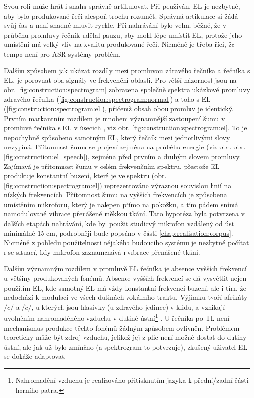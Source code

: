 Svou roli může hrát i snaha správně artikulovat.
Při používání EL je nezbytné, aby bylo produkované řeči alespoň trochu rozumět.
Správná artikulace si žádá svůj čas a není snadné mluvit rychle.
Při nahrávání bylo velmi běžné, že v průběhu promluvy řečník udělal pauzu, aby mohl lépe umístit EL, protože jeho umístění má velký vliv na kvalitu produkované řeči.
Nicméně je třeba říci, že tempo není pro ASR systémy problém.

Dalším způsobem jak ukázat rozdíly mezi promluvou zdravého řečníka a řečníka s EL, je porovnat oba signály ve frekvenční oblasti.
Pro větší názornost jsou na obr. \ref{fig:construction:spectrogram} zobrazena společně spektra ukázkové promluvy zdravého řečníka (\ref{fig:construction:spectrogram:normal}) a toho s EL (\ref{fig:construction:spectrogram:el}), přičemž obsah obou promluv je identický.
Prvním markantním rozdílem je mnohem významnější zastoupení šumu v promluvě řečníka s EL v úsecích , viz obr. \ref{fig:construction:spectrogram:el}.
To je nepochybně způsobeno samotným EL, který řečník mezi jednotlivými slovy nevypíná.
Přítomnost šumu se projeví zejména na průběhu energie (viz obr. obr. \ref{fig:construction:el_speech}), zejména před prvním a druhým slovem promluvy.
Zajímavá je přítomnost šumu v celém frekvenčním spektru, přestože EL produkuje konstantní buzení, které je ve spektru (obr. \ref{fig:construction:spectrogram:el}) reprezentováno výraznou souvislou linií na nízkých frekvencích.
Přítomnost šumu na vyšších frekvencích je způsobena umístěním mikrofonu, který je nalepen přímo na pokožku, a tím pádem snímá namodulované vibrace přenášené měkkou tkání.
Tato hypotéza byla potvrzena v dalších etapách nahrávání, kde byl použit studiový mikrofon vzdálený od úst minimálně 15 cm, podrobněji bude popsáno v části \ref{chap:realisation:corpus}.
Nicméně z pohledu použitelnosti nějakého budoucího systému je nezbytné počítat i se situací, kdy mikrofon zaznamenává i vibrace přenášené tkání.

Dalším významným rozdílem v promluvě EL řečníka je absence vyšších frekvencí u většiny produkovaných fonémů.
Absence vyšších frekvencí se dá vysvětlit nejen použitím EL, kde samotný EL má vždy konstantní frekvenci buzení, ale i tím, že nedochází k modulaci ve všech dutinách vokálního traktu.
Výjimku tvoří afrikáty $/c/$ a $/\check{c}/$, u kterých jsou hlasivky (u zdravého jedince) v klidu, a vznikají uvolněním nahromaděného vzduchu v dutině ústní\footnote{Nahromadění vzduchu je realizováno přitisknutím jazyka k přední/zadní části horního patra.} \cite{Psutka2006}.
U řečníka po TL není mechanismus produkce těchto fonémů žádným způsobem ovlivněn.
Problémem teoreticky může být zdroj vzduchu, jelikož jej z plic není možné dostat do dutiny ústní, ale jak už bylo zmíněno (a spektrogram to potvrzuje), zkušený uživatel EL se dokáže adaptovat.

